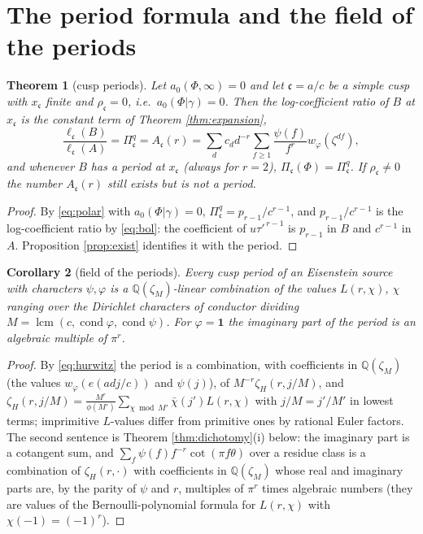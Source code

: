 \documentclass[11pt]{amsart}
\newtheorem{theorem}{Theorem}[section]
\newtheorem{corollary}[theorem]{Corollary}
\theoremstyle{definition}
\theoremstyle{remark}
\newcommand{\Q}{\mathbb Q}\newcommand{\Z}{\mathbb Z}\newcommand{\R}{\mathbb R}\newcommand{\C}{\mathbb C}\newcommand{\HH}{\mathbb H}
\newcommand{\ct}{a_0}\renewcommand{\Re}{\operatorname{Re}}\renewcommand{\Im}{\operatorname{Im}}
\DeclareMathOperator{\lcmop}{lcm}\DeclareMathOperator{\ord}{ord}\DeclareMathOperator{\Res}{Res}\DeclareMathOperator{\Gal}{Gal}
\newcommand{\cc}{\mathfrak c}\newcommand{\Pc}{\Pi_{\cc}}\newcommand{\Pq}{\Pi^{q}}
\begin{document}
\section{The period formula and the field of the periods}\label{sec:period}

\begin{theorem}[cusp periods]\label{thm:period}
Let $\ct(\Phi,\infty)=0$ and let $\cc=a/c$ be a simple cusp with $x_{\cc}$ finite and $\rho_{\cc}=0$, i.e.\ $\ct(\Phi|\gamma)=0$. Then the log-coefficient ratio of $B$ at $x_{\cc}$ is the constant term of Theorem \ref{thm:expansion},
$$\frac{\ell_{\cc}(B)}{\ell_{\cc}(A)}=\Pq_{\cc}=A_{\cc}(r)=\sum_dc_dd^{-r}\sum_{f\ge1}\frac{\psi(f)}{f^r}w_\varphi(\zeta^{df}),$$
and whenever $B$ has a period at $x_{\cc}$ (always for $r=2$), $\Pc(\Phi)=\Pq_{\cc}$. If $\rho_{\cc}\ne0$ the number $A_{\cc}(r)$ still exists but is not a period.
\end{theorem}
\begin{proof}
By \eqref{eq:polar} with $\ct(\Phi|\gamma)=0$, $\Pq_{\cc}=p_{r-1}/c^{r-1}$, and $p_{r-1}/c^{r-1}$ is the log-coefficient ratio by \eqref{eq:bol}: the coefficient of $u\tau'^{\,r-1}$ is $p_{r-1}$ in $B$ and $c^{r-1}$ in $A$. Proposition \ref{prop:exist} identifies it with the period.
\end{proof}

\begin{corollary}[field of the periods]\label{cor:field}
Every cusp period of an Eisenstein source with characters $\psi,\varphi$ is a $\Q(\zeta_M)$-linear combination of the values $L(r,\chi)$, $\chi$ ranging over the Dirichlet characters of conductor dividing $M=\lcmop(c,\operatorname{cond}\varphi,\operatorname{cond}\psi)$. For $\varphi=\mathbf 1$ the imaginary part of the period is an algebraic multiple of $\pi^r$.
\end{corollary}
\begin{proof}
By \eqref{eq:hurwitz} the period is a combination, with coefficients in $\Q(\zeta_M)$ (the values $w_\varphi(e(adj/c))$ and $\psi(j)$), of $M^{-r}\zeta_H(r,j/M)$, and $\zeta_H(r,j/M)=\frac{M^r}{\phi(M')}\sum_{\chi\bmod M'}\bar\chi(j')L(r,\chi)$ with $j/M=j'/M'$ in lowest terms; imprimitive $L$-values differ from primitive ones by rational Euler factors. The second sentence is Theorem \ref{thm:dichotomy}(i) below: the imaginary part is a cotangent sum, and $\sum_f\psi(f)f^{-r}\cot(\pi f\theta)$ over a residue class is a combination of $\zeta_H(r,\cdot)$ with coefficients in $\Q(\zeta_M)$ whose real and imaginary parts are, by the parity of $\psi$ and $r$, multiples of $\pi^r$ times algebraic numbers (they are values of the Bernoulli-polynomial formula for $L(r,\chi)$ with $\chi(-1)=(-1)^r$).
\end{proof}
\end{document}
